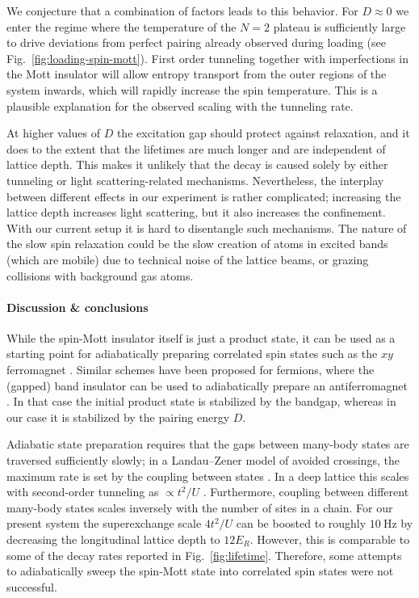 \documentclass[aps,prl,twocolumn]{revtex4-1}
\begin{document}
We conjecture that a combination of factors leads to this behavior. For $D \approx 0$ we enter the regime where the temperature of the $N = 2$ plateau is sufficiently large to drive deviations from perfect pairing already observed during loading (see Fig.~\ref{fig:loading-spin-mott}). First order tunneling together with imperfections in the Mott insulator will allow entropy transport from the outer regions of the system inwards, which will rapidly increase the spin temperature. This is a plausible explanation for the observed scaling with the tunneling rate.

At higher values of $D$ the excitation gap should protect against relaxation, and it does to the extent that the lifetimes are much longer and are independent of lattice depth. This makes it unlikely that the decay is caused solely by either tunneling or light scattering-related mechanisms. Nevertheless, the interplay between different effects in our experiment is rather complicated; increasing the lattice depth increases light scattering, but it also increases the confinement. With our current setup it is hard to disentangle such mechanisms.  The nature of the slow spin relaxation  could be the slow creation of atoms in excited bands (which are mobile) due to technical noise of the lattice beams, or grazing collisions with background gas atoms.

\paragraph*{Discussion \& conclusions}
While the spin-Mott insulator itself is just a product state, it can be used as a starting point for adiabatically preparing correlated spin states such as the $xy$ ferromagnet \cite{Altman03, Schachenmayer15}. Similar schemes have been proposed for fermions, where the (gapped) band insulator can be used to adiabatically prepare an antiferromagnet \cite{Lubasch11}. In that case the initial product state is stabilized by the bandgap, whereas in our case it is stabilized by the pairing energy $D$.

Adiabatic state preparation requires that the gaps between many-body states are traversed sufficiently slowly; in a Landau--Zener model of avoided crossings, the maximum rate is set by the coupling between states  \cite{Zener32, Landau32, Rubbmark81}. In a deep lattice this scales with second-order tunneling as $\propto t^2/U$ \cite{Kuklov03, Schachenmayer15, Chung21}. Furthermore, coupling between different many-body states scales inversely with the number of sites in a chain. For our present system the superexchange scale  $4t^2/U$ can be boosted to roughly $10~\mathrm{Hz}$ by decreasing the longitudinal lattice depth to $12E_R$. However, this is comparable to some of the decay rates reported in Fig.~\ref{fig:lifetime}. Therefore, some attempts to adiabatically sweep the spin-Mott state into correlated spin states were not successful.
\end{document}
